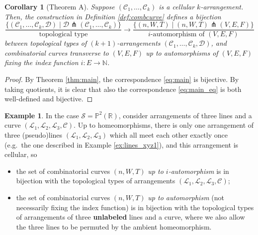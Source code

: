 \documentclass[11pt,reqno]{amsart}
\theoremstyle{plain}
\newtheorem{corollary}[subsection]{Corollary}
\theoremstyle{definition}
\newtheorem{example}[subsection]{Example}
\theoremstyle{remark}
\numberwithin{equation}{subsection}
\newcommand*{\bbN}{\mathbb{N}}
\newcommand*{\bbP}{\mathbb{P}}
\newcommand*{\bbR}{\mathbb{R}}
\newcommand*{\calC}{\mathcal{C}}
\newcommand*{\calD}{\mathcal{D}}
\newcommand*{\calL}{\mathcal{L}}
\newcommand*{\calS}{\mathcal{S}}
\begin{document}
\begin{corollary}[Theorem A]\label{cor:main_eq}
    Suppose $(\calC_1,\dots,\calC_k)$ is a cellular $k$-arrangement. Then, the construction in Definition \ref{def:combcurve} defines a bijection
    \begin{equation}\label{eq:main_eq}
        \frac{\{(\calC_1,\dots,\calC_k,\calD)\mid\calD\pitchfork(\calC_1,\dots,\calC_k)\}}{\text{topological type}}\to\frac{\{(n,W,T)\mid(n,W,T)\pitchfork(V,E,F)\}}{\text{$i$-automorphism of $(V,E,F)$}}
    \end{equation}
    between topological types of $(k+1)$-arrangements $(\calC_1,\dots,\calC_k,\calD)$, and combinatorial curves transverse to $(V,E,F)$ up to automorphisms of $(V,E,F)$ fixing the index function $i\colon E\to\bbN$.
\end{corollary}

\begin{proof}
    By Theorem \ref{thm:main}, the correspondence \eqref{eq:main} is bijective. By taking quotients, it is clear that also the correspondence \eqref{eq:main_eq} is both well-defined and bijective.
\end{proof}

\begin{example}\label{ex:unlabeled}
    In the case $\calS=\bbP^2(\bbR)$, consider arrangements of three lines and a curve $(\calL_1,\calL_2,\calL_3,\calC)$. Up to homeomorphisms, there is only one arrangement of three (pseudo)lines $(\calL_1,\calL_2,\calL_3)$ which all meet each other exactly once (e.g.\ the one described in Example \ref{ex:lines_xyz1}), and this arrangement is cellular, so
    \begin{itemize}
        \item the set of combinatorial curves $(n,W,T)$ \textit{up to $i$-automorphism} is in bijection with the topological types of arrangements $(\calL_1,\calL_2,\calL_3,\calC)$;
        \item the set of combinatorial curves $(n,W,T)$ \textit{up to automorphism} (not necessarily fixing the index function) is in bijection with the topological types of arrangements of three \textbf{unlabeled} lines and a curve, where we also allow the three lines to be permuted by the ambient homeomorphism.
    \end{itemize}
\end{example}
\end{document}
